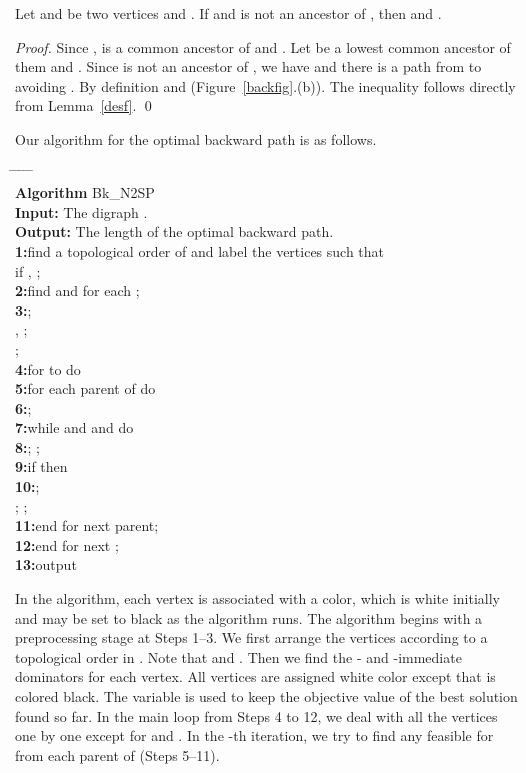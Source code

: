 \begin{corollary}\label{black}
Let  and  be two vertices and . If  and  is not an ancestor of , then  and .
\end{corollary}
\begin{proof}
Since ,  is a common ancestor of  and .
Let  be a lowest common ancestor of them and .
Since  is not an ancestor of , we have  and there is a path from  to  avoiding .
By definition  and  (Figure~\ref{backfig}.(b)).
The inequality follows directly from Lemma~\ref{desf}.
\qed\end{proof}

Our algorithm for the optimal backward path is as follows. 
\begin{tabbing}
\hspace*{1.5em} \= \hspace*{1.2em} \= \hspace*{1.2em} \= \hspace*{1.2em} \= \hspace*{1.2em} \= \kill \\
{\bf Algorithm} Bk\_N2SP \\
{\bf Input: }The digraph . \\
{\bf Output: }The length of the optimal backward path. \\
{\bf 1:}\>find a topological order of  and label the vertices such that \\
\>if , ;\\
{\bf 2:}\>find  and  for each ;\\
{\bf 3:}\>;\\
\>, ;\\
\>;\\
{\bf 4:}\>for  to  do \\
{\bf 5:}\>\>for each parent  of  do \\
{\bf 6:}\>\>\>; \\
{\bf 7:}\>\>\>while  and  and  do\\
{\bf 8:}\>\>\>\>; ; \\
{\bf 9:}\>\>\>if  then\\
{\bf 10:}\>\>\>\>; \\
\>\>\>\>; ;\\
{\bf 11:}\>\>end for next parent;\\
{\bf 12:}\>end for next ;\\
{\bf 13:}\>output \\
\end{tabbing}


In the algorithm, each vertex  is associated with a color, which is white initially and may be set to black as the algorithm runs.
The algorithm begins with a preprocessing stage at Steps 1--3.
We first arrange the vertices according to a topological order in .
Note that  and .
Then we find the - and -immediate dominators for each vertex.
All vertices are assigned white color except that  is colored black.
The variable  is used to keep the objective value of the best solution found so far.
In the main loop from Steps 4 to 12, we deal with all the vertices one by one except for  and . 
In the -th iteration, we try to find any feasible  for  from each parent of  (Steps 5--11).

